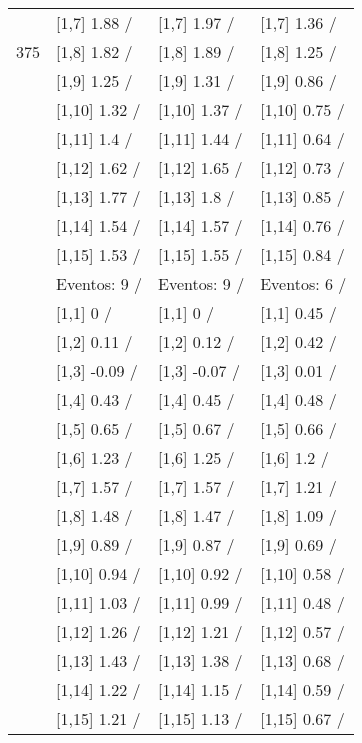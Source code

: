 \begin{table}
\begin{tabular}[t]{llll}
 & {}[1,7] 1.88  / & {}[1,7] 1.97  / & {}[1,7] 1.36  /\\
375 & {}[1,8] 1.82  / & {}[1,8] 1.89  / & {}[1,8] 1.25  /\\
\addlinespace
 & {}[1,9] 1.25  / & {}[1,9] 1.31  / & {}[1,9] 0.86  /\\
 & {}[1,10] 1.32  / & {}[1,10] 1.37  / & {}[1,10] 0.75  /\\
 & {}[1,11] 1.4  / & {}[1,11] 1.44  / & {}[1,11] 0.64  /\\
 & {}[1,12] 1.62  / & {}[1,12] 1.65  / & {}[1,12] 0.73  /\\
 & {}[1,13] 1.77  / & {}[1,13] 1.8  / & {}[1,13] 0.85  /\\
\addlinespace
 & {}[1,14] 1.54  / & {}[1,14] 1.57  / & {}[1,14] 0.76  /\\
 & {}[1,15] 1.53  / & {}[1,15] 1.55  / & {}[1,15] 0.84  /\\
 & Eventos:  9 / & Eventos:  9 / & Eventos:  6 /\\
 & {}[1,1] 0  / & {}[1,1] 0  / & {}[1,1] 0.45  /\\
 & {}[1,2] 0.11  / & {}[1,2] 0.12  / & {}[1,2] 0.42  /\\
\addlinespace
 & {}[1,3] -0.09  / & {}[1,3] -0.07  / & {}[1,3] 0.01  /\\
 & {}[1,4] 0.43  / & {}[1,4] 0.45  / & {}[1,4] 0.48  /\\
 & {}[1,5] 0.65  / & {}[1,5] 0.67  / & {}[1,5] 0.66  /\\
 & {}[1,6] 1.23  / & {}[1,6] 1.25  / & {}[1,6] 1.2  /\\
 & {}[1,7] 1.57  / & {}[1,7] 1.57  / & {}[1,7] 1.21  /\\
\addlinespace
500 & {}[1,8] 1.48  / & {}[1,8] 1.47  / & {}[1,8] 1.09  /\\
 & {}[1,9] 0.89  / & {}[1,9] 0.87  / & {}[1,9] 0.69  /\\
 & {}[1,10] 0.94  / & {}[1,10] 0.92  / & {}[1,10] 0.58  /\\
 & {}[1,11] 1.03  / & {}[1,11] 0.99  / & {}[1,11] 0.48  /\\
 & {}[1,12] 1.26  / & {}[1,12] 1.21  / & {}[1,12] 0.57  /\\
\addlinespace
 & {}[1,13] 1.43  / & {}[1,13] 1.38  / & {}[1,13] 0.68  /\\
 & {}[1,14] 1.22  / & {}[1,14] 1.15  / & {}[1,14] 0.59  /\\
 & {}[1,15] 1.21  / & {}[1,15] 1.13  / & {}[1,15] 0.67  /\\
\bottomrule
\end{tabular}
\end{table}
